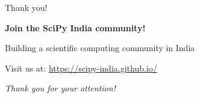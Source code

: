 \documentclass[16pt,t]{beamer}
\begin{document}
\begin{frame}{Thank you!}
\begin{center}
\Large
\textbf{Join the SciPy India community!}

\vspace{1cm}

\large
Building a scientific computing community in India

\vspace{1cm}

\normalsize
Visit us at: \url{https://scipy-india.github.io/}

\vspace{0.5cm}

\vspace{1cm}

\textit{Thank you for your attention!}
\end{center}
\end{frame}



% 
\end{document}
